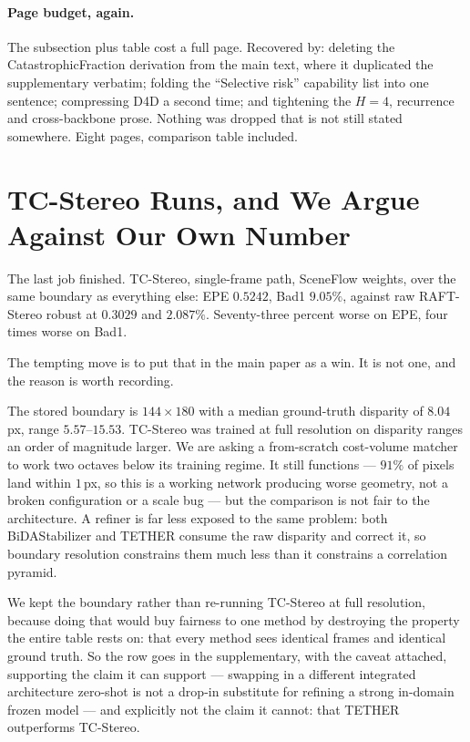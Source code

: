 \documentclass[11pt,a4paper]{article}
\begin{document}
\paragraph{Page budget, again.} The subsection plus table cost a full
page. Recovered by: deleting the CatastrophicFraction derivation from the
main text, where it duplicated the supplementary verbatim; folding the
``Selective risk'' capability list into one sentence; compressing D4D a
second time; and tightening the $H=4$, recurrence and cross-backbone
prose. Nothing was dropped that is not still stated somewhere. Eight
pages, comparison table included.



\section*{TC-Stereo Runs, and We Argue Against Our Own Number}

The last job finished. TC-Stereo, single-frame path, SceneFlow weights,
over the same boundary as everything else: EPE $0.5242$, Bad1 $9.05\%$,
against raw RAFT-Stereo robust at $0.3029$ and $2.087\%$. Seventy-three
percent worse on EPE, four times worse on Bad1.

The tempting move is to put that in the main paper as a win. It is not
one, and the reason is worth recording.

The stored boundary is $144\times180$ with a median ground-truth disparity
of $8.04$\,px, range $5.57$--$15.53$. TC-Stereo was trained at full
resolution on disparity ranges an order of magnitude larger. We are asking
a from-scratch cost-volume matcher to work two octaves below its training
regime. It still functions --- $91\%$ of pixels land within $1$\,px, so
this is a working network producing worse geometry, not a broken
configuration or a scale bug --- but the comparison is not fair to the
architecture. A refiner is far less exposed to the same problem: both
BiDAStabilizer and TETHER consume the raw disparity and correct it, so
boundary resolution constrains them much less than it constrains a
correlation pyramid.

We kept the boundary rather than re-running TC-Stereo at full resolution,
because doing that would buy fairness to one method by destroying the
property the entire table rests on: that every method sees identical
frames and identical ground truth. So the row goes in the supplementary,
with the caveat attached, supporting the claim it can support --- swapping
in a different integrated architecture zero-shot is not a drop-in
substitute for refining a strong in-domain frozen model --- and explicitly
not the claim it cannot: that TETHER outperforms TC-Stereo.
\end{document}
